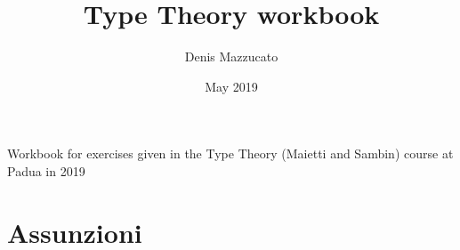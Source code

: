 \documentclass{article}
\title{Type Theory workbook}
\author{Denis Mazzucato}
\date{May 2019}
\begin{document}
\maketitle
\vfill
\begin{center}
Workbook for exercises given in the Type Theory (Maietti and Sambin) course at Padua in 2019
\end{center}
\newpage

\tableofcontents
\vfill

\section*{Assunzioni}



\end{document}
